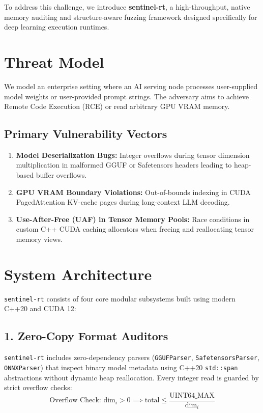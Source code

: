 \documentclass[10pt,twocolumn,a4paper]{article}
\begin{document}
To address this challenge, we introduce \textbf{sentinel-rt}, a high-throughput, native memory auditing and structure-aware fuzzing framework designed specifically for deep learning execution runtimes.

\section{Threat Model}
We model an enterprise setting where an AI serving node processes user-supplied model weights or user-provided prompt strings. The adversary aims to achieve Remote Code Execution (RCE) or read arbitrary GPU VRAM memory.

\subsection{Primary Vulnerability Vectors}
\begin{enumerate}
    \item \textbf{Model Deserialization Bugs:} Integer overflows during tensor dimension multiplication in malformed GGUF or Safetensors headers leading to heap-based buffer overflows.
    \item \textbf{GPU VRAM Boundary Violations:} Out-of-bounds indexing in CUDA PagedAttention KV-cache pages during long-context LLM decoding.
    \item \textbf{Use-After-Free (UAF) in Tensor Memory Pools:} Race conditions in custom C++ CUDA caching allocators when freeing and reallocating tensor memory views.
\end{enumerate}

\section{System Architecture}
\texttt{sentinel-rt} consists of four core modular subsystems built using modern C++20 and CUDA 12:

\subsection{1. Zero-Copy Format Auditors}
\texttt{sentinel-rt} includes zero-dependency parsers (\texttt{GGUFParser}, \texttt{SafetensorsParser}, \texttt{ONNXParser}) that inspect binary model metadata using C++20 \texttt{std::span} abstractions without dynamic heap reallocation. Every integer read is guarded by strict overflow checks:
\begin{equation}
\text{Overflow Check: } \text{dim}_i > 0 \implies \text{total} \le \frac{\text{UINT64\_MAX}}{\text{dim}_i}
\end{equation}
\end{document}
